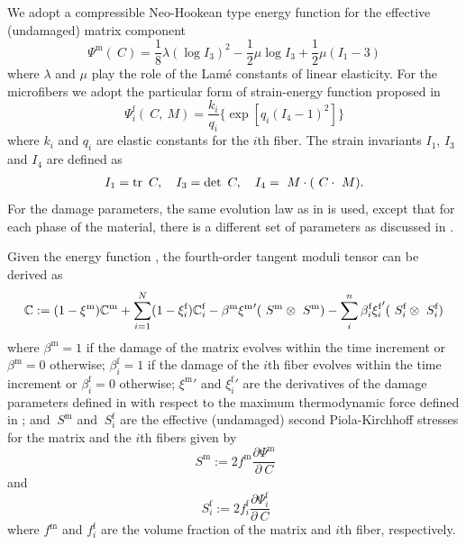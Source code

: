 \documentclass[12pt]{article}
\newcommand{\mtrx}{{\text{m}}}
\newcommand{\fiber}{{\text{f}}}
\numberwithin{equation}{section}
\begin{document}
We adopt a compressible Neo-Hookean type energy function for the
effective (undamaged) matrix component
\begin{equation}\label{eq:aniso-Psim0}
  \Psi^\mtrx (~C)
    = \frac{1}{8}\lambda (\log I_3)^2
    - \frac{1}{2}\mu \log I_3
    + \frac{1}{2}\mu( I_1 - 3)
\end{equation}
where $\lambda$ and $\mu$ play the role of the Lam\'{e} constants of
linear elasticity. For the microfibers we adopt the particular form of
strain-energy function proposed in \cite{Holzapfel.etal:2010}
\begin{equation}
  \Psi^\fiber_i(~C, ~M)
    = \frac{k_i}{q_i}
    \{ \exp[q_i(I_4 - 1)^2] \}
\end{equation}
where $k_i$ and $q_i$ are elastic constants for the $i$th fiber.  The
strain invariants $I_1$, $I_3$ and $I_4$ are defined as
\begin{gather}
  I_1 = \operatorname{\text{tr}} ~C,
  \quad
  I_3 = \det ~C,
  \quad
  I_4 = ~M \cdot (~C \cdot ~M).
\end{gather}
For the damage parameters, the same evolution law as in
 is used, except that for each phase of the material,
there is a different set of parameters as discussed in
\citet{Chen.etal:2014}.

Given the energy function , the fourth-order
tangent moduli tensor can be derived as
\begin{equation}\label{eq:aniso-tangent}
  \bbC
  : =
  (1-\xi^\mtrx) \bbC^\mtrx
  +
  \sum_{i=1}^N (1-\xi^\fiber_i) \bbC^\fiber_i
  -
  \beta^\mtrx {\xi^\mtrx}'  (~S^\mtrx \otimes ~S^\mtrx )
  -
  \sum_i^n \beta^\fiber_i {\xi^\fiber_i}' (~S^\fiber_i \otimes ~S^\fiber_i)
\end{equation}
where $\beta^\mtrx = 1$ if the damage of the matrix evolves within the
time increment or $\beta^\mtrx=0$ otherwise; $\beta^\fiber_i = 1$ if
the damage of the $i$th fiber evolves within the time increment or
$\beta^\fiber_i=0$ otherwise; ${\xi^\mtrx}'$ and ${\xi^\fiber_i}'$ are
the derivatives of the damage parameters defined in 
with respect to the maximum thermodynamic force defined in
; and $~S^\mtrx$ and $~S^\fiber_i$ are the effective
(undamaged) second Piola-Kirchhoff stresses for the matrix and the
$i$th fibers given by
\begin{equation}\label{eq:aniso-S0m}
  ~S^\mtrx
  :=
  2 f^\mtrx \frac{\partial \Psi^\mtrx}{\partial~C}
\end{equation}
and
\begin{equation}\label{eq:aniso-S0i}
  ~S^\fiber_i
  :=
  2 f^\fiber_i \frac{\partial \Psi^\fiber_i}{\partial~C}
\end{equation}
where $f^\mtrx$ and $f^\fiber_i$ are the volume fraction of the matrix
and $i$th fiber, respectively.
\end{document}

